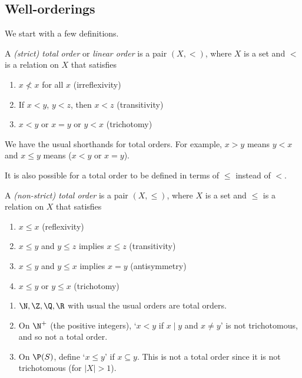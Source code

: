 \documentclass[a4paper]{article}
\begin{document}
\subsection{Well-orderings}
We start with a few definitions.
\begin{defi}
  A \emph{(strict) total order} or \emph{linear order} is a pair $(X, <)$, where $X$ is a set and $<$ is a relation on $X$ that satisfies
  \begin{enumerate}
    \item $x \not< x$ for all $x$ \hfill (irreflexivity)
    \item If $x < y$, $y < z$, then $x < z$ \hfill (transitivity)
    \item $x < y$ or $x = y$ or $y < x$ \hfill (trichotomy)
  \end{enumerate}
\end{defi}

We have the usual shorthands for total orders. For example, $x > y$ means $y < x$ and $x \leq y$ means ($x < y$ or $x = y$).

It is also possible for a total order to be defined in terms of $\leq$ instead of $<$.
\begin{defi}
  A \emph{(non-strict) total order} is a pair $(X, \leq)$, where $X$ is a set and $\leq$ is a relation on $X$ that satisfies
  \begin{enumerate}
    \item $x \leq x$ \hfill (reflexivity)
    \item $x\leq y$ and $y \leq z$ implies $x\leq z$ \hfill (transitivity)
    \item $x\leq y$ and $y\leq x$ implies $x = y$ \hfill (antisymmetry)
    \item $x\leq y$ or $y\leq x$ \hfill (trichotomy)
  \end{enumerate}
\end{defi}

\begin{eg}\leavevmode
  \begin{enumerate}
    \item $\N, \Z, \Q, \R$ with usual the usual orders are total orders.
    \item On $\N^+$ (the positive integers), `$x < y$ if $x\mid y$ and $x \not=y$' is not trichotomous, and so not a total order.
    \item On $\P(S)$, define `$x\leq y$' if $x\subseteq y$. This is not a total order since it is not trichotomous (for $|X| > 1$).
  \end{enumerate}
\end{eg}
\end{document}
